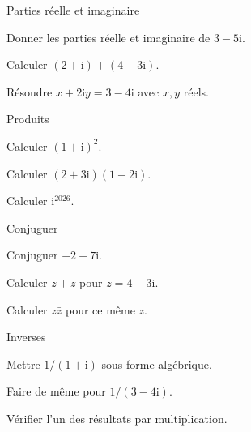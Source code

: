 \exercices
{}
\begingroup\renewcommand{\otBesoinPlace}[1]{}\begin{minipage}{\linewidth}
\begin{exercice}[1]{Parties réelle et imaginaire}

\begin{questions}
\item Donner les parties réelle et imaginaire de $3-5\mathrm i$.
\item Calculer $(2+\mathrm i)+(4-3\mathrm i)$.
\item Résoudre $x+2\mathrm iy=3-4\mathrm i$ avec $x,y$ réels.
\end{questions}
\end{exercice}
\begin{exercice}[1]{Produits}

\begin{questions}
\item Calculer $(1+\mathrm i)^2$.
\item Calculer $(2+3\mathrm i)(1-2\mathrm i)$.
\item Calculer $\mathrm i^{2026}$.
\end{questions}
\end{exercice}
\begin{exercice}[1]{Conjuguer}

\begin{questions}
\item Conjuguer $-2+7\mathrm i$.
\item Calculer $z+\bar z$ pour $z=4-3\mathrm i$.
\item Calculer $z\bar z$ pour ce même $z$.
\end{questions}
\end{exercice}
\begin{exercice}[1]{Inverses}

\begin{questions}
\item Mettre $1/(1+\mathrm i)$ sous forme algébrique.
\item Faire de même pour $1/(3-4\mathrm i)$.
\item Vérifier l’un des résultats par multiplication.
\end{questions}
\end{exercice}
\end{minipage}\endgroup
\clearpage
{}
